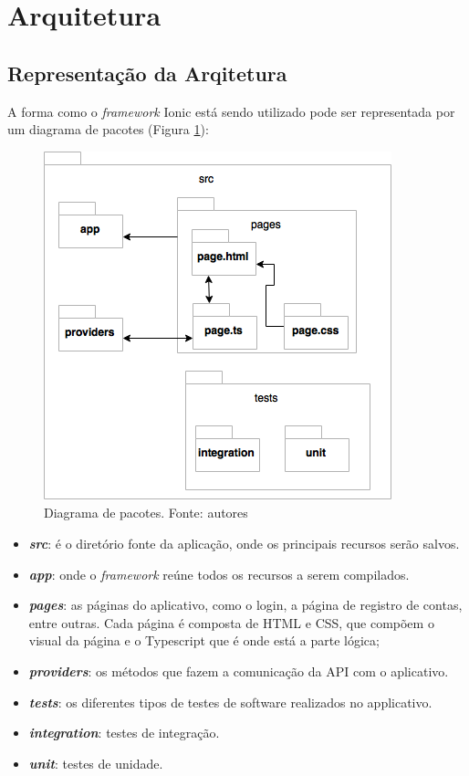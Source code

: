 \section{Arquitetura}

\subsection{Representação da Arqitetura}

A forma como o \textit{framework} Ionic está sendo utilizado pode ser representada por um diagrama de pacotes (Figura \ref{img:pacotes}):

\begin{figure}[H]
    \centering
    \includegraphics[scale=0.5]{figuras/ionic_arch.png}
    \caption[Diagrama de pacotes do aplicativo]{Diagrama de pacotes. Fonte: autores}
    \label{img:pacotes}
\end{figure}
\pagebreak

\begin{itemize}
\item\textbf{\textit{src}}: é o diretório fonte da aplicação, onde os principais recursos serão salvos.
\item\textbf{\textit{app}}: onde o \textit{framework} reúne todos os recursos a serem compilados.
\item\textbf{\textit{pages}}: as páginas do aplicativo, como o login, a página de registro de contas, entre outras. Cada página é composta de HTML e CSS, que compõem o visual da página e o Typescript que é onde está a parte lógica;
\item\textbf{\textit{providers}}: os métodos que fazem a comunicação da API com o aplicativo.
\item\textbf{\textit{tests}}: os diferentes tipos de testes de software realizados no applicativo.
\item\textbf{\textit{integration}}: testes de integração.
\item\textbf{\textit{unit}}: testes de unidade.
\end{itemize}

